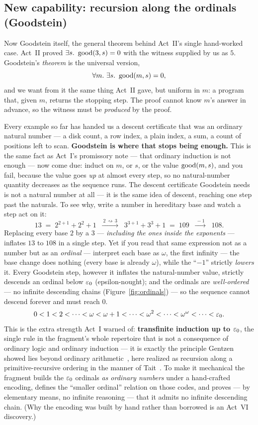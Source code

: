 \documentclass[11pt]{article}
\begin{document}
\subsection*{New capability: recursion along the ordinals (Goodstein)}

Now Goodstein itself, the general theorem behind Act~II's single hand-worked
case. Act~II proved $\exists s.\ \good(3,s)=0$ with the witness supplied by us
as $5$. Goodstein's \emph{theorem} is the universal version,
\[
  \forall m.\ \exists s.\ \operatorname{good}(m,s)=0,
\]
and we want from it the same thing Act~II gave, but uniform in $m$: a program
that, given $m$, returns the stopping step. The proof cannot know $m$'s answer
in advance, so the witness must be \emph{produced} by the proof.

Every example so far has handed us a descent certificate that was an ordinary
natural number --- a disk count, a row index, a plain index, a sum, a count of
positions left to scan. \textbf{Goodstein is where that stops being enough.}
This is the same fact as Act~I's promissory note --- that ordinary induction is
not enough --- now come due: induct on $m$, or $s$, or the value $\operatorname{good}(m,s)$,
and you fail, because the value goes \emph{up} at almost every step, so no
natural-number quantity decreases as the sequence runs. The descent certificate
Goodstein needs is not a natural number at all --- it is the same idea of
descent, reaching one step past the naturals.
To see why, write a number in hereditary base and watch a step act on it:
\[
  13 \;=\; 2^{2+1} + 2^{2} + 1
  \;\;\xrightarrow{\ 2\,\rightsquigarrow\,3\ }\;\;
  3^{3+1} + 3^{3} + 1 \;=\; 109
  \;\;\xrightarrow{\ -1\ }\;\; 108.
\]
Replacing every base $2$ by a $3$ --- \emph{including the ones inside the
exponents} --- inflates $13$ to $108$ in a single step. Yet if you read that
same expression not as a number but as an \emph{ordinal} --- interpret each
base as $\omega$, the first infinity --- the base change does nothing (every
base is already $\omega$), while the ``$-1$'' strictly \emph{lowers} it. Every
Goodstein step, however it inflates the natural-number value, strictly descends
an ordinal below $\varepsilon_0$ (epsilon-nought); and the ordinals are
\emph{well-ordered} --- no infinite descending chains
(Figure~\ref{fig:ordinals}) --- so the sequence cannot descend forever and must
reach $0$.
\[
  0 < 1 < 2 < \cdots < \omega < \omega+1 < \cdots < \omega^2 < \cdots
    < \omega^\omega < \cdots < \varepsilon_0 .
\]
This is the extra strength Act~I warned of: \textbf{transfinite induction up to
$\varepsilon_0$}, the single rule in the fragment's whole repertoire that is not a
consequence of ordinary logic and ordinary induction --- it is exactly the
principle Gentzen showed lies beyond ordinary arithmetic~\citep{gentzen1943},
here realized as recursion along a primitive-recursive ordering in the manner
of Tait~\citep{tait1965}. To make it mechanical the
fragment builds the $\varepsilon_0$ ordinals \emph{as ordinary numbers} under a
hand-crafted encoding, defines the ``smaller ordinal'' relation on those codes,
and proves --- by elementary means, no infinite reasoning --- that it admits no
infinite descending chain. (Why the encoding was built by hand rather than
borrowed is an Act~VI discovery.)
\end{document}
